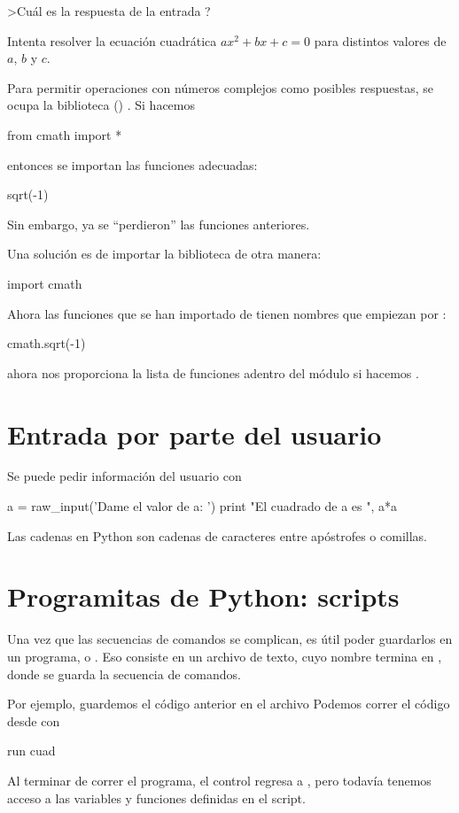 \ej >Cuál es la respuesta de la entrada ?

\ej Intenta resolver la ecuación cuadrática $a x^2 + b x + c = 0$ para distintos valores de $a$, $b$ y $c$. 



Para permitir operaciones con números complejos como posibles respuestas, se ocupa la biblioteca () .
Si hacemos
\begin{python}
from cmath import *
\end{python}
entonces se importan las funciones adecuadas:
\begin{python}
sqrt(-1)
\end{python}
Sin embargo, ya se ``perdieron'' las funciones anteriores. 

Una solución es de importar la biblioteca de otra manera:
\begin{python}
import cmath
\end{python}
Ahora las funciones que se han importado de  tienen nombres que empiezan por :
\begin{python}
cmath.sqrt(-1)
\end{python}
 ahora nos proporciona la lista de funciones adentro del módulo si hacemos .



\section{Entrada por parte del usuario}
Se puede pedir información del usuario con
\begin{python}
a = raw_input('Dame el valor de a: ')
print "El cuadrado de a es ", a*a
\end{python}
Las cadenas en Python son cadenas de caracteres entre apóstrofes o comillas. 


\section{Programitas de Python: scripts}
Una vez que las secuencias de comandos se complican, es útil poder guardarlos en un programa, o .
Eso consiste en un archivo de texto, cuyo nombre termina en , donde se guarda la secuencia de comandos.

Por ejemplo, guardemos el código anterior en el archivo 
Podemos correr el código desde  con
\begin{python}
run cuad
\end{python}
Al terminar de correr el programa, el control regresa a , pero todavía tenemos acceso a las variables y funciones definidas en el script.

